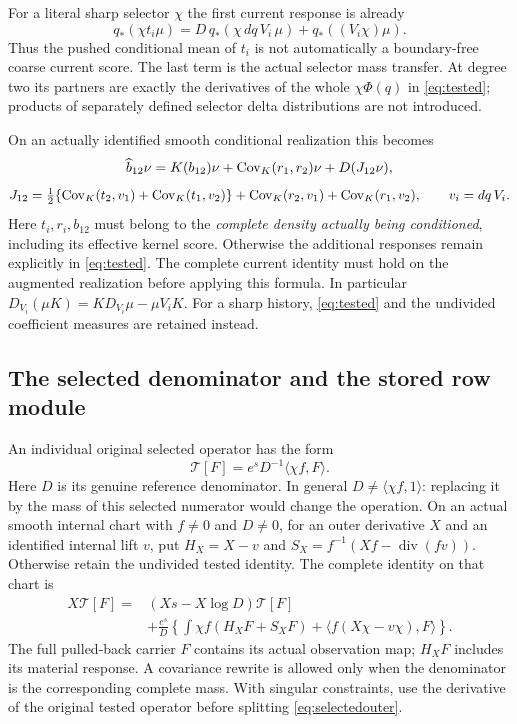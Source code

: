\documentclass[11pt,letterpaper]{article}
\theoremstyle{remark}\newtheorem{remark}[theorem]{Remark}
\newcommand{\diver}{\operatorname{div}}\newcommand{\Ad}{\operatorname{Ad}}
\providecommand{\mathscr}{\mathcal}
\begin{document}
For a literal sharp selector $\chi$ the first current response is already
\[
 q_*(\chi t_i\mu)
 =D\,q_*(\chi\,dq\,V_i\,\mu)+q_*((V_i\chi)\mu).
\]
Thus the pushed conditional mean of $t_i$ is not automatically a boundary-free coarse current score. The last term is the actual selector mass transfer. At degree two its partners are exactly the derivatives of the whole $\chi\Phi(q)$ in \eqref{eq:tested}; products of separately defined selector delta distributions are not introduced.

On an actually identified smooth conditional realization this becomes
\begin{equation}\label{eq:completepacket}
 \widehat b_{12}\nu
 =
 K(b_{12})\nu+\operatorname{Cov}_K(r_1,r_2)\nu+D(J_{12}\nu),
\end{equation}
\[
 J_{12}=\tfrac12\{\operatorname{Cov}_K(t_2,v_1)+\operatorname{Cov}_K(t_1,v_2)\}
       +\operatorname{Cov}_K(r_2,v_1)+\operatorname{Cov}_K(r_1,v_2),
 \qquad v_i=dq\,V_i.
\]
Here $t_i,r_i,b_{12}$ must belong to the \emph{complete density actually being conditioned}, including its effective kernel score. Otherwise the additional responses remain explicitly in \eqref{eq:tested}. The complete current identity must hold on the augmented realization before applying this formula. In particular
$D_{V_i}(\mu K)=K D_{V_i}\mu-\mu V_iK$.
For a sharp history, \eqref{eq:tested} and the undivided coefficient measures are retained instead.

\subsection{The selected denominator and the stored row module}

An individual original selected operator has the form
\[
 \mathscr T[F]=e^sD^{-1}\langle\chi f,F\rangle.
\]
Here $D$ is its genuine reference denominator. In general $D\ne\langle\chi f,1\rangle$: replacing it by the mass of this selected numerator would change the operation.
On an actual smooth internal chart with $f\ne0$ and $D\ne0$, for an outer derivative $X$ and an identified internal lift $v$, put $H_X=X-v$ and $S_X=f^{-1}(Xf-\diver(fv))$. Otherwise retain the undivided tested identity. The complete identity on that chart is
\begin{align}\label{eq:selectedouter}
 X\mathscr T[F]
 ={}&(Xs-X\log D)\mathscr T[F]\\
 &+\frac{e^s}{D}\left\{
   \int\chi f(H_XF+S_XF)
   +\langle f(X\chi-v\chi),F\rangle\right\}.\nonumber
\end{align}
The full pulled-back carrier $F$ contains its actual observation map; $H_XF$ includes its material response. A covariance rewrite is allowed only when the denominator is the corresponding complete mass. With singular constraints, use the derivative of the original tested operator before splitting \eqref{eq:selectedouter}.
\end{document}

